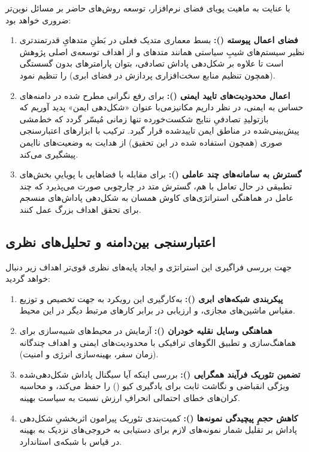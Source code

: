 \documentclass[oneside,openany,phd]{TMU-Thesis}
\begin{document}
با عنایت به ماهیت پویای فضای نرم‌افزار، توسعه روش‌های حاضر بر مسائل نوین‌تر ضروری خواهد بود:
\begin{enumerate}
    \item \textbf{فضای اعمال پیوسته ():} بسط معماری متدیک فعلی در بَطنِ متدهایِ قدرتمندتری نظیر سیستم‌های شیبِ سیاستی همانند متدهای  و  از اهداف توسعه‌ی اصلی پژوهش است تا علاوه بر شکل‌دهی پاداش تصادفی، بتوان پارامترهای بدون گسستگی (همچون تنظیم منابع سخت‌افزاری پردازش در فضای ابری) را تنظیم نمود.
    \item \textbf{اعمال محدودیت‌های تایید ایمنی ():} برای رفع نگرانی مطرح شده در دامنه‌های حساس به ایمنی، در نظر داریم مکانیزمی‌با عنوان «شکل‌دهی ایمن» پدید آوریم که بازتولیدِ تصادفیِ نتایج شکست‌خورده تنها زمانی مُیسّر گردد که خط‌مشی پیش‌بینی‌شده در مناطق ایمن تاییدشده قرار گیرد. ترکیب با ابزارهای اعتبارسنجی صوری (همچون  استفاده شده در این تحقیق) از هدایت به وضعیت‌های ناایمن پیشگیری می‌کند.
    \item \textbf{گسترش به سامانه‌های چند عاملی ():} برای مقابله با فضاهایی با پویاییِ بخش‌های تطبیقی در حال تعامل با هم، گسترش متد در چارچوبی صورت می‌پذیرد که چند عامل در هماهنگی استراتژی‌های کاوش همسان به شکل‌دهی پاداش‌های منسجم برای تحقق اهداف بزرگ عمل کنند.
\end{enumerate}

\subsection{اعتبارسنجی بین‌دامنه و تحلیل‌های نظری}

جهت بررسی فراگیری این استراتژی و ایجاد پایه‌های نظری قوی‌تر اهداف زیر دنبال خواهد گردید:
\begin{enumerate}
    \item \textbf{پیکر‌بندی شبکه‌های ابری ():} به‌کارگیری این رویکرد به جهت تخصیص و توزیع مقیاس ماشین‌های مجازی، و ارزیابی در برابر کارهای مرتبط دیگر در این محیط.
    \item \textbf{هماهنگی وسایل نقلیه خودران ():} آزمایش در محیط‌های شبیه‌سازی برای هماهنگ‌سازی و تطبیق الگوهای ترافیکی با محدودیت‌های ایمنی و اهداف چندگانه (زمان سفر، بهینه‌سازی انرژی و امنیت).
    \item \textbf{تضمین تئوریک فرآیند همگرایی ():} بررسی اینکه آیا سیگنال پاداش شکل‌دهی‌شده ویژگی انقباضی و نگاشت ثابت برای یادگیری کیو () را حفظ می‌کند، و محاسبه کران‌های خطای احتمالی انحرافِ ارزش  نسبت به سیاست بهینه.
    \item \textbf{کاهش حجمِ پیچیدگی نمونه‌ها ():} کمیت‌بندی تئوریک پیرامون اثربخشیِ شکل‌دهی پاداش بر تقلیل شمار نمونه‌های لازم برای دستیابی به خروجی‌های نزدیک به بهینه در قیاس با شبکه‌ی  استاندارد.
\end{enumerate}
\end{document}

